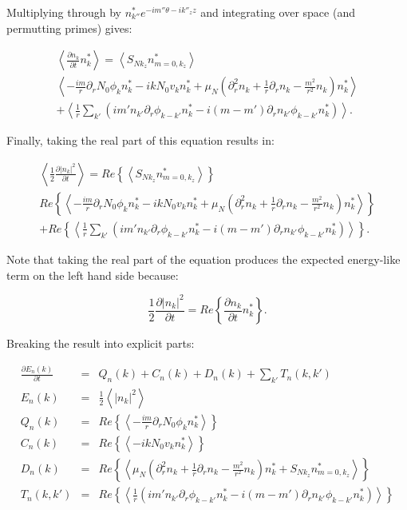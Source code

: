 \documentclass[12pt]{article}
\def\beq{\begin{equation}}
\def\eeq{\end{equation}}
\def\beqar{\begin{eqnarray}}
\def\eeqar{\end{eqnarray}}
\newcommand{\pdiff}[2]{\frac{\partial#1}{\partial#2}}
\newcommand{\pdr}{\partial_r}
\newcommand{\pdrr}{\partial^2_r}
\begin{document}
Multiplying through by $n_{k''}^* e^{- i m'' \theta - i k''_z z}$ and integrating over space (and permutting primes) gives:

\beqar
\label{density_evolution}
\left< \pdiff{n_k}{t} n_k^* \right> = \left< S_{N k_z} n_{m=0,k_z}^* \right>  \nonumber \\
\left< -\frac{i m}{r} \pdr N_0 \phi_k n_k^* - i k N_0 v_k n_k^* + \mu_N( \pdrr n_k + \frac{1}{r} \pdr n_k - \frac{m^2}{r^2} n_k) n_k^*  \right> \nonumber \\
+ \left< \frac{1}{r} \sum_{k'} \left( i m' n_{k'} \pdr \phi_{k-k'} n_k^*  - i (m - m') \pdr n_{k'} \phi_{k-k'} n_k^*        \right) \right>.
\eeqar

Finally, taking the real part of this equation results in:

\beqar
\label{real_density_evolution}
\left< \frac{1}{2} \pdiff{|n_k|^2}{t} \right> = Re \left\{ \left< S_{N k_z} n_{m=0,k_z}^* \right> \right\} \nonumber \\
Re \left\{ \left< -\frac{i m}{r} \pdr N_0 \phi_k n_k^* - i k N_0 v_k n_k^* + \mu_N( \pdrr n_k + \frac{1}{r} \pdr n_k - \frac{m^2}{r^2} n_k) n_k^* \right> \right\} \nonumber \\
+ Re \left\{ \left< \frac{1}{r} \sum_{k'} \left( i m' n_{k'} \pdr \phi_{k-k'} n_k^*  - i (m - m') \pdr n_{k'} \phi_{k-k'} n_k^*        \right) \right> \right\}.
\eeqar

Note that taking the real part of the equation produces the expected energy-like term on the left hand side because:

\beq
\frac{1}{2} \pdiff{|n_k|^2}{t} = Re \left\{ \pdiff{n_k}{t} n_k^* \right\}.
\eeq

Breaking the result into explicit parts:

\beqar
\label{Fourier_density_evolution}
\pdiff{E_n(k)}{t} & = & Q_n(k) + C_n(k) + D_n(k) + \sum_{k'} T_n(k,k') \\
E_n(k) & = & \frac{1}{2} \left< |n_k|^2 \right> \\
Q_n(k) & = & Re \left\{ \left< -\frac{i m}{r} \pdr N_0 \phi_k n_k^* \right> \right\} \\
C_n(k) & = & Re \left\{ \left< - i k N_0 v_k n_k^* \right> \right\} \\
D_n(k) & = & Re \left\{ \left<  \mu_N( \pdrr n_k + \frac{1}{r} \pdr n_k - \frac{m^2}{r^2} n_k) n_k^*  + S_{N k_z} n_{m=0,k_z}^*  \right> \right\} \\
T_n(k,k') & = & Re \left\{ \left< \frac{1}{r} \left( i m' n_{k'} \pdr \phi_{k-k'} n_k^*  - i (m - m') \pdr n_{k'} \phi_{k-k'} n_k^*        \right) \right> \right\}
\eeqar
\end{document}
